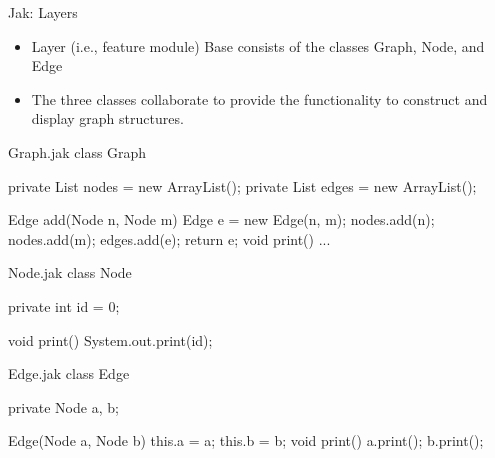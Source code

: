 \begin{frame}[fragile]{Jak: Layers}
	\begin{mycolumns}[widths={60},animation=none]
		\begin{example}{}
			\begin{itemize}
				\item Layer (i.e., feature module) Base consists of the classes Graph, Node, and Edge 
				\item The three classes collaborate to provide the functionality to construct and display graph structures.
			\end{itemize}
		\end{example}
	\mynextcolumn
	\end{mycolumns}
	\begin{mycolumns}[t,columns=3,widths={43,27},animation=none]
\begin{codetight}{Graph.jak}
class Graph {
	private List nodes = new ArrayList();
	private List edges = new ArrayList();
	
	Edge add(Node n, Node m) {
		Edge e = new Edge(n, m);
		nodes.add(n); nodes.add(m); edges.add(e);
		return e;
	}
	void print() { ... }
}
\end{codetight}		
	\mynextcolumn
\begin{codetight}{Node.jak}
class Node {
	private int id = 0;

	void print() {
		System.out.print(id);
	}
}
\end{codetight}
	\mynextcolumn
\begin{codetight}{Edge.jak}
class Edge {
	private Node a, b;
	
	Edge(Node a, Node b) {
		this.a = a; this.b = b;
	}
	void print() {
		a.print(); b.print();
	}
}
\end{codetight}			
	\end{mycolumns}
\end{frame}

